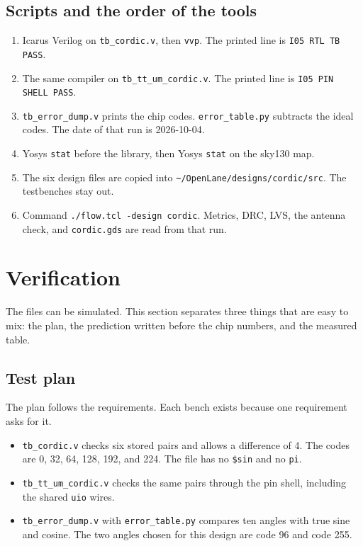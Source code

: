 \documentclass[11pt,a4paper]{article}
\begin{document}
\subsection{Scripts and the order of the tools}
\begin{enumerate}
  \item Icarus Verilog on \texttt{tb\_cordic.v}, then \texttt{vvp}. The printed line is \texttt{I05 RTL TB PASS}.
  \item The same compiler on \texttt{tb\_tt\_um\_cordic.v}. The printed line is \texttt{I05 PIN SHELL PASS}.
  \item \texttt{tb\_error\_dump.v} prints the chip codes. \texttt{error\_table.py} subtracts the ideal codes. The date of that run is 2026-10-04.
  \item Yosys \texttt{stat} before the library, then Yosys \texttt{stat} on the sky130 map.
  \item The six design files are copied into \texttt{\textasciitilde/OpenLane/designs/cordic/src}. The testbenches stay out.
  \item Command \texttt{./flow.tcl -design cordic}. Metrics, DRC, LVS, the antenna check, and \texttt{cordic.gds} are read from that run.
\end{enumerate}

\section{Verification}

The files can be simulated. This section separates three things that are easy to mix: the plan, the prediction written before the chip numbers, and the measured table.

\subsection{Test plan}
The plan follows the requirements. Each bench exists because one requirement asks for it.
\begin{itemize}
  \item \texttt{tb\_cordic.v} checks six stored pairs and allows a difference of 4. The codes are 0, 32, 64, 128, 192, and 224. The file has no \texttt{\$sin} and no \texttt{pi}.
  \item \texttt{tb\_tt\_um\_cordic.v} checks the same pairs through the pin shell, including the shared \texttt{uio} wires.
  \item \texttt{tb\_error\_dump.v} with \texttt{error\_table.py} compares ten angles with true sine and cosine. The two angles chosen for this design are code 96 and code 255.
\end{itemize}
\end{document}
